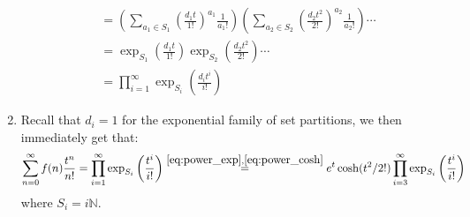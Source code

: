 \begin{solution}
\begin{enumerate}[label=(\alph*)]
\begin{align*}
            &= \left(\sum_{a_1\in S_1} \left(\frac{d_1t}{1!}\right)^{a_1} \frac{1}{a_1!}\right)\left(\sum_{a_2\in S_2} \left(\frac{d_2t^2}{2!}\right)^{a_2} \frac{1}{a_2!}\right)\cdots \\
            &= \exp_{S_1} \left(\frac{d_1t}{1!}\right) \exp_{S_2} \left(\frac{d_2t^2}{2!}\right)\cdots \\
            &= \prod_{i=1}^\infty \exp_{S_i}\left(\frac{d_it^i}{i!}\right)
        \end{align*}
        \item Recall that $d_i = 1$ for the exponential family of set partitions, we then immediately get that:
        \[
            \bsum[n] f(n) \frac{t^n}{n!} = \prod_{i=1}^\infty \exp_{S_i}\left(\frac{t^i}{i!}\right) \estep{\eqref{eq:power_exp}, \eqref{eq:power_cosh}} e^{t}\cosh(t^2/2!) \prod_{i=3}^\infty \exp_{S_i} \left(\frac{t^i}{i!}\right)
        \]
        where $S_i = i\mathbb{N}$.
    \end{enumerate}
\end{solution}


